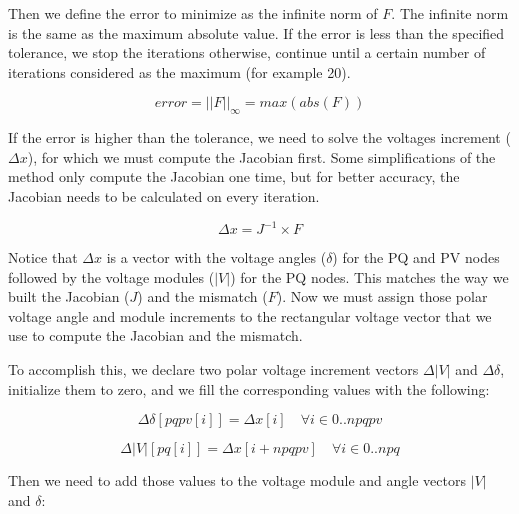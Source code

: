 \documentclass[a4paper,twoside,fleqn]{tufte-book}
\begin{document}
Then we define the error to minimize as the infinite norm of $F$. The infinite norm is the same as the maximum absolute value. If the error is less than the specified tolerance, we stop the iterations otherwise, continue until a certain number of iterations considered as the maximum (for example 20).

\begin{equation}
error = ||F||_{\infty} = max(abs(F))
\label{eq:nr_error}
\end{equation}

If the error is higher than the tolerance, we need to solve the voltages increment ($\Delta x$), for which we must compute the Jacobian first. Some simplifications of the method only compute the Jacobian one time, but for better accuracy, the Jacobian needs to be calculated on every iteration.


\begin{equation}
\Delta x = J^{-1} \times F
\label{eq:nr_solve}
\end{equation}

Notice that $\Delta x$ is a vector with the voltage angles ($\delta$) for the PQ and PV nodes followed by the voltage modules ($|V|$) for the PQ nodes. This matches the way we built the Jacobian ($J$) and the mismatch ($F$). Now we must assign those polar voltage angle and module increments to the rectangular voltage vector that we use to compute the Jacobian and the mismatch.

To accomplish this, we declare two polar voltage increment vectors $\Delta |V|$ and $\Delta \delta$, initialize them to zero, and we fill the corresponding values with the following:

\begin{equation}
\Delta \delta[pqpv[i]] = \Delta x[i]  \quad \forall i \in {0..npqpv}
\label{eq:nr_dd1}
\end{equation}

\begin{equation}
\Delta  |V|[pq[i]] = \Delta x[i+npqpv]  \quad \forall i \in {0..npq}
\end{equation}

Then we need to add those values to the voltage module and angle vectors $|V|$ and $\delta$:
\end{document}
